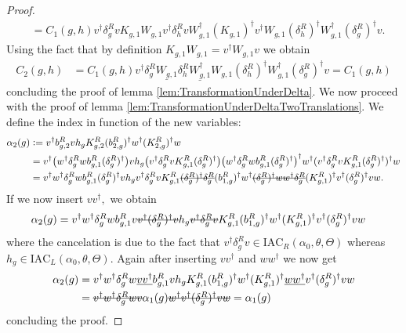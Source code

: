 \documentclass[11pt,a4paper,twoside]{article}
\numberwithin{equation}{section}
\begin{document}
\begin{proof}
\begin{align}
			&=C_1(g,h)v^\dagger \delta_g^R v K_{g,1} W_{g,1}v^\dagger \delta_h^R v W_{g,1}^\dagger (K_{g,1})^\dagger v^\dagger W_{g,1}(\delta^R_h)^\dagger W_{g,1}^\dagger(\delta_g^R)^\dagger v.
		\end{align}
		Using the fact that by definition $K_{g,1}W_{g,1}=v^\dagger W_{g,1}v$ we obtain
		\begin{align}
			C_2(g,h)&=C_1(g,h)v^\dagger \delta_g^R \underline{W_{g,1}} \delta_h^R \underline{W_{g,1}^\dagger} W_{g,1}(\delta^R_h)^\dagger W_{g,1}^\dagger(\delta_g^R)^\dagger v=C_1(g,h)
		\end{align}
		concluding the proof of lemma \ref{lem:TransformationUnderDelta}. We now proceed with the proof of lemma \ref{lem:TransformationUnderDeltaTwoTranslations}. We define the index in function of the new variables:
		\begin{align}
			\alpha_2(g)&\defeq v^\dagger b^R_{g,2}v h_g K^R_{g,2}(b^R_{2,g})^\dagger w^\dagger (K^R_{2,g})^\dagger w\\
			&=v^\dagger \left(w^\dagger\delta^R_g w b_{g,1}^R (\delta^R_g)^\dagger\right) v h_g \left(v^\dagger \delta_g^R v K_{g,1}^R (\delta_g^R)^\dagger\right) \left(w^\dagger\delta^R_g w b_{g,1}^R (\delta^R_g)^\dagger\right)^\dagger w^\dagger (v^\dagger \delta_g^R v K_{g,1}^R (\delta_g^R)^\dagger)^\dagger w\\
			&=v^\dagger w^\dagger\delta^R_g w b_{g,1}^R (\delta^R_g)^\dagger v h_g v^\dagger \delta_g^R v K_{g,1}^R \stkout{(\delta_g^R)^\dagger \delta_g^R} (b_{1,g}^R)^\dagger w^\dagger \stkout{(\delta_g^R)^\dagger w w^\dagger \delta_g^R} (K_{g,1}^R)^\dagger v^\dagger (\delta_g^R)^\dagger v  w.
		\end{align}
		If we now insert $vv^\dagger,$ we obtain
		\begin{align}
			\alpha_2(g)&=v^\dagger w^\dagger\delta^R_g w b_{g,1}^R v\stkout{v^\dagger (\delta^R_g)^\dagger v} h_g \stkout{v^\dagger \delta_g^R v} K_{g,1}^R (b_{1,g}^R)^\dagger w^\dagger (K_{g,1}^R)^\dagger v^\dagger (\delta_g^R)^\dagger v  w
		\end{align}
		where the cancelation is due to the fact that $v^\dagger \delta^R_g v\in\textrm{IAC}_{R}(\alpha_0,\theta,\Theta)$ whereas $h_g\in \textrm{IAC}_{L}(\alpha_0,\theta,\Theta)$. Again after inserting $vv^\dagger$ and $ww^\dagger$ we now get
		\begin{align}
			\alpha_2(g)&=v^\dagger w^\dagger\delta^R_g w \underline{v v^\dagger} b_{g,1}^R v h_g K_{g,1}^R (b_{1,g}^R)^\dagger w^\dagger (K_{g,1}^R)^\dagger \underline{ww^\dagger} v^\dagger (\delta_g^R)^\dagger v  w\\
			&=\stkout{v^\dagger w^\dagger\delta^R_g w v} \alpha_1(g) \stkout{w^\dagger v^\dagger (\delta_g^R)^\dagger v  w}=\alpha_1(g)
		\end{align}
		concluding the proof.
	\end{proof}
\end{document}
